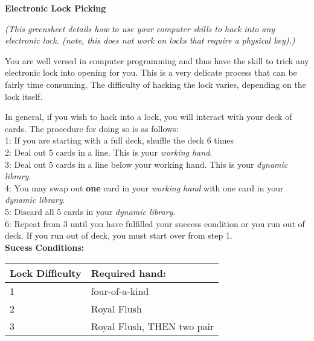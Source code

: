 \documentclass[green]{guildcamp1}
\begin{document}
\name{\gHacking{}}

\textbf{Electronic Lock Picking}

\emph{(This greensheet details how to use your computer skills to hack into any electronic lock. (note, this does not work on locks that require a physical key).)}

You are well versed in computer programming and thus have the skill to trick any electronic lock into opening for you.  This is a very delicate process that can be fairly time consuming. The difficulty of hacking the lock varies, depending on the lock itself.

In general, if you wish to hack into a lock, you will interact with your deck of cards. The procedure for doing so is as follows:\\
1: If you are starting with a full deck, shuffle the deck 6 times\\
2: Deal out 5 cards in a line. This is your {\em working hand}.\\
3: Deal out 5 cards in a line below your working hand. This is your {\em dynamic library}.\\
4: You may swap out {\bf one} card in your {\em working hand} with one card in your {\em dynamic library}.\\
5: Discard all 5 cards in your {\em dynamic library}.\\
6: Repeat from 3 until you have fulfilled your success condition or you run out of deck.  If you run out of deck, you must start over from step 1.\\

{\bf Sucess Conditions:}
\begin{tabular}{||l|l||}
\hline\hline
Lock Difficulty	& Required hand:\\
\hline
1	& four-of-a-kind\\
2	& Royal Flush\\
3	& Royal Flush, THEN two pair\\
\hline\hline
\end{tabular}
\end{document}
